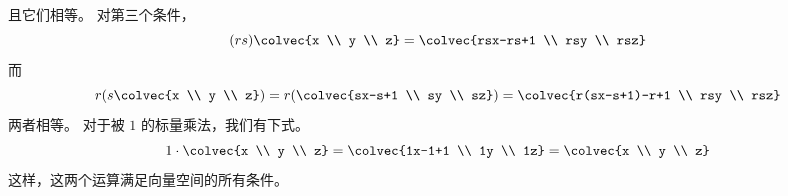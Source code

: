 \begin{answer}
\begin{exparts}
\begin{multline*}
           \end{multline*}
           且它们相等。
           对第三个条件，
           \begin{equation*}
             (rs)\colvec{x \\ y \\ z}
             =\colvec{rsx-rs+1 \\ rsy \\ rsz}
           \end{equation*}
           而
           \begin{equation*}
             r(s\colvec{x \\ y \\ z})
             =r(\colvec{sx-s+1 \\ sy \\ sz})
             =\colvec{r(sx-s+1)-r+1 \\ rsy \\ rsz}
           \end{equation*}
           两者相等。
           对于被 $1$ 的标量乘法，我们有下式。
           \begin{equation*}
             1\cdot\colvec{x \\ y \\ z}
             =\colvec{1x-1+1 \\ 1y \\ 1z}
             =\colvec{x \\ y \\ z}
           \end{equation*}
           这样，这两个运算满足向量空间的所有条件。


\end{exparts}
\end{answer}
